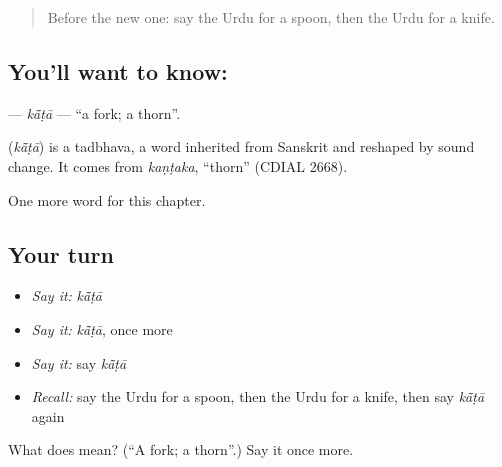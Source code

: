 \label{lesson:UR-C60-kata}



\begin{quote}
Before the new one: say the Urdu for a spoon, then the Urdu for a knife.
\end{quote}

\subsection*{You'll want to know: }
\textbf{} — \emph{kā̃ṭā} — \textquotedblleft{}a fork; a thorn\textquotedblright{}.

\begin{cousinweb}
\textbf{} (\emph{kā̃ṭā}) is a tadbhava, a word inherited from Sanskrit and reshaped by sound change. It comes from \emph{kaṇṭaka}, \textquotedblleft{}thorn\textquotedblright{} (CDIAL 2668).
\end{cousinweb}

\begin{grammarlens}[title={What you've built}]
One more word for this chapter.
\end{grammarlens}

\subsection*{Your turn}
\begin{itemize}
\raggedright
  \item \emph{Say it:} \emph{kā̃ṭā}
  \item \emph{Say it:} \emph{kā̃ṭā}, once more
  \item \emph{Say it:} say \emph{kā̃ṭā}
  \item \emph{Recall:} say the Urdu for a spoon, then the Urdu for a knife, then say \emph{kā̃ṭā} again
\end{itemize}

\begin{tcolorbox}[breakable,colback=teal!4,colframe=teal!35!black,title={Before you move on}]
What does  mean? (\textquotedblleft{}A fork; a thorn\textquotedblright{}.) Say it once more.
\end{tcolorbox}
